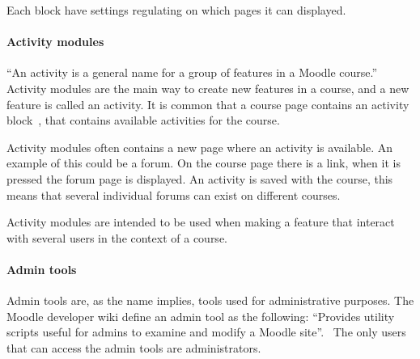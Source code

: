 Each block have settings regulating on which pages it can displayed. %




\paragraph{Activity modules}
\label{par:activitymodules}
``An activity is a general name for a group of features in a Moodle course.''~\cite{activity} 
Activity modules are the main way to create new features in a course, and a new feature is called an activity. 
It is common that a course page contains an activity block~\cite{activityblock}, that contains available activities for the course. 

Activity modules often contains a new page where an activity is available. 
An example of this could be a forum. 
On the course page there is a link, when it is pressed the forum page is displayed. 
An activity is saved with the course, this means that several individual forums can exist on different courses.

Activity modules are intended to be used when making a feature that interact with several users in the context of a course.  

\paragraph{Admin tools}
Admin tools are, as the name implies, tools used for administrative purposes. 
The Moodle developer wiki define an admin tool as the following: 
``Provides utility scripts useful for admins to examine and modify a Moodle site''.~\cite{plugin} 
The only users that can access the admin tools are administrators. 

